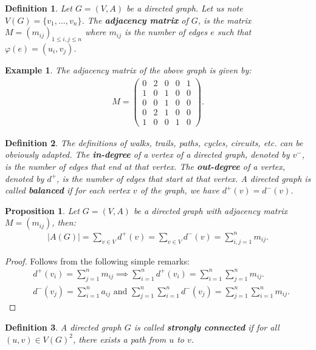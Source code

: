\documentclass[12pt,a4paper]{article}
\newtheorem{prop}{Proposition}[section]
\newtheorem{defn}{Definition}[section]
\newtheorem{exmp}{Example}[section]
\theoremstyle{definition}
\begin{document}
\begin{defn} Let $G=(V,A)$ be a directed graph. Let us note $V(G)=\{v_1, \dots ,  v_n\}$. The \textbf{adjacency matrix} of $G$, is the matrix $M=(m_{ij})_{1 \leq i,j \leq n }$ where $m_{ij}$ is the number of edges $e$ such that $\varphi(e)=(u_i,v_j)$.
\end{defn}
\begin{exmp} The adjacency matrix of the above graph is given by:
\begin{align*}
M=\begin{pmatrix}
0 & 2 & 0 & 0 & 1 \\
1 & 0 & 1 & 0 & 0 \\
0 & 0 & 1 & 0 & 0 \\
0 & 2 & 1 & 0 & 0 \\
1 & 0 & 0 & 1 & 0
\end{pmatrix}.
\end{align*}
\end{exmp}
\begin{defn} The definitions of walks, trails, paths, cycles, circuits, etc. can be obviously adapted. The \textbf{in-degree} of a vertex of a directed graph, denoted by $v^-$, is the number of edges that end at that vertex. The \textbf{out-degree} of a vertex, denoted by $d^+$, is the number of edges that start at that vertex. A directed graph is called \textbf{balanced} if for each vertex $v$ of the graph, we have $d^+(v)=d^-(v)$.
\end{defn}
\newpage
\begin{prop} Let $G=(V,A)$ be a directed graph with adjacency matrix $M=(m_{ij})$, then:
\begin{align*}
|A(G)| = \sum_{v \in V} d^+(v) = \sum_{v \in V} d^-(v) = \sum_{i,j=1}^n m_{ij}.
\end{align*}
\end{prop}
\begin{proof}
Follows from the following simple remarks: 
\begin{align*}
&d^+(v_i) = \sum_{j=1}^n m_{ij} \implies \sum_{i=1}^n d^+ (v_i)= \sum_{i=1}^n \sum_{j=1}^n m_{ij}. \\
&d^-(v_j)= \sum_{i=1}^n a_{ij} \text{ and } \sum_{j=1}^n \sum_{i=1}^n d^-(v_j)= \sum_{j=1}^n \sum_{i=1}^n m_{ij}. 
\end{align*}
\end{proof}
\begin{defn} A directed graph $G$ is called \textbf{strongly connected} if for all $(u,v) \in V(G)^2$, there exists a path from $u$ to $v$.
\end{defn}
\end{document}
